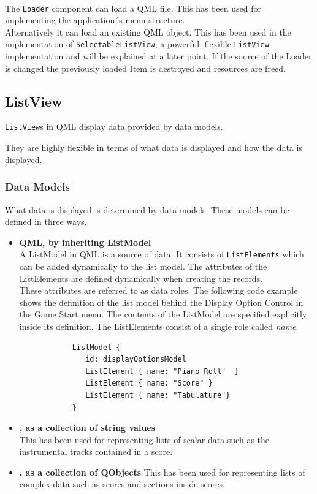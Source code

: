 \paragraph{}
The {\tt Loader} component can load a QML file. This has been used for implementing the application´s menu structure. \\
Alternatively it can load an existing QML object. This has been used in the implementation of  {\tt SelectableListView}, a powerful, flexible {\tt ListView} implementation and will be explained at a later point.
If the source of the Loader is changed the previously loaded Item is destroyed and resources are freed.
\subsection {ListView}
{\tt ListView}s in QML display data provided by data models.


They are highly flexible in terms of what data is displayed and how the data is displayed.
\subsubsection{Data Models}
What data is displayed is determined by data models.
These models can be defined in three ways.
\begin {itemize}
	\item {
		\textbf{QML, by inheriting ListModel} \\
		A ListModel in QML is a source of data. It consists of {\tt ListElements} which can be added dynamically to the list model. The attributes of the ListElements are defined dynamically when creating the records. \\
		These attributes are referred to as data roles. The following code example shows the definition of the list model behind the Display Option Control in the Game Start menu. The contents of the ListModel are specified explicitly inside its definition. The ListElements consist of a single role called \textit{name}.
		\begin{lstlisting}
			ListModel {
               id: displayOptionsModel
               ListElement { name: "Piano Roll"  }
               ListElement { name: "Score" }
               ListElement { name: "Tabulature"}
          	}
		\end{lstlisting}
	}
	\item {
		\textbf{\cpp, as a collection of string values} \\
		This has been used for representing lists of scalar data such as the instrumental tracks contained in a score.
	}
	
	\item {
		\textbf{\cpp, as a collection of QObjects}
		This has been used for representing lists of complex data such as scores and sections inside scores.	
	}
\end {itemize}
